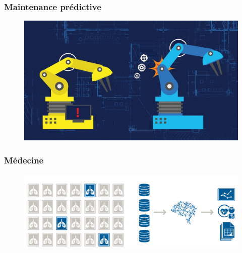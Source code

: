 \documentclass[compress]{beamer}
\begin{document}
\begin{frame}
	\frametitle{Maintenance prédictive}
	
	\begin{figure}
		\centering
		\includegraphics[width=1\linewidth]{resources/maintenance}
		
	\end{figure}
	
\end{frame}

\begin{frame}
	\frametitle{Médecine}
	
	\begin{figure}
		\centering
		\includegraphics[width=1\linewidth]{resources/medical}
	\end{figure}
	
\end{frame}
\end{document}
